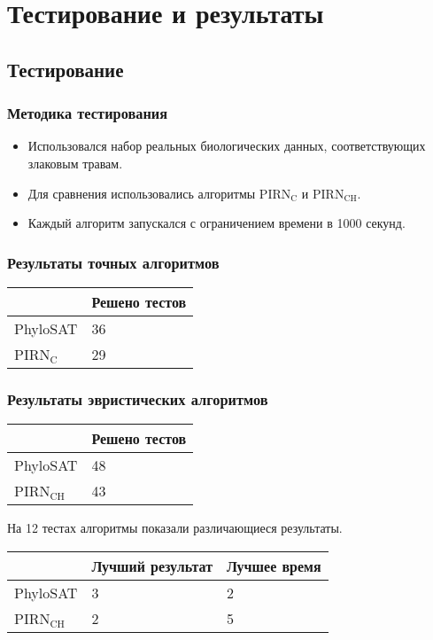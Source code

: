 \documentclass[hyperref={unicode}]{beamer}
\begin{document}
\section{Тестирование и результаты}

\subsection{Тестирование}

\begin{frame}
\frametitle{Методика тестирования}

\begin{itemize}
	\item Использовался набор реальных биологических данных, соответствующих злаковым травам.
	\item Для сравнения использовались алгоритмы $\mathrm{PIRN_C}$ и $\mathrm{PIRN_{CH}}$.
	\item Каждый алгоритм запускался с ограничением времени в 1000 секунд.
\end{itemize}

\end{frame}

\begin{frame}
\frametitle{Результаты точных алгоритмов}

\begin{table}
\begin{tabular}{l | l}
	& Решено тестов \\
	\hline
	PhyloSAT & 36 \\
	PIRN$\mathrm{_C}$ & 29 \\
\end{tabular}
\end{table}

\end{frame}

\begin{frame}
\frametitle{Результаты эвристических алгоритмов}

\begin{table}
\begin{tabular}{l | l}
	& Решено тестов \\
	\hline
	PhyloSAT & 48 \\
	PIRN$\mathrm{_{CH}}$ & 43 \\
\end{tabular}
\end{table}

На 12 тестах алгоритмы показали различающиеся результаты.

\begin{table}
\begin{tabular}{l | l | l}
	& Лучший результат & Лучшее время \\
	\hline
	PhyloSAT & 3 & 2 \\
	PIRN$\mathrm{_{CH}}$ & 2 & 5 \\
\end{tabular}
\end{table}

\end{frame}
\end{document}

